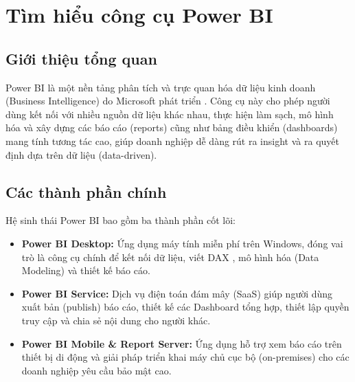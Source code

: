 \section{Tìm hiểu công cụ Power BI}

\subsection{Giới thiệu tổng quan}
Power BI là một nền tảng phân tích và trực quan hóa dữ liệu kinh doanh (Business Intelligence) do Microsoft phát triển \cite{powerbi_docs}. Công cụ này cho phép người dùng kết nối với nhiều nguồn dữ liệu khác nhau, thực hiện làm sạch, mô hình hóa và xây dựng các báo cáo (reports) cũng như bảng điều khiển (dashboards) mang tính tương tác cao, giúp doanh nghiệp dễ dàng rút ra insight và ra quyết định dựa trên dữ liệu (data-driven).

\subsection{Các thành phần chính}
Hệ sinh thái Power BI bao gồm ba thành phần cốt lõi:
\begin{itemize}
    \item \textbf{Power BI Desktop:} Ứng dụng máy tính miễn phí trên Windows, đóng vai trò là công cụ chính để kết nối dữ liệu, viết DAX \cite{dax_reference}, mô hình hóa (Data Modeling) và thiết kế báo cáo.
    \item \textbf{Power BI Service:} Dịch vụ điện toán đám mây (SaaS) giúp người dùng xuất bản (publish) báo cáo, thiết kế các Dashboard tổng hợp, thiết lập quyền truy cập và chia sẻ nội dung cho người khác.
    \item \textbf{Power BI Mobile \& Report Server:} Ứng dụng hỗ trợ xem báo cáo trên thiết bị di động và giải pháp triển khai máy chủ cục bộ (on-premises) cho các doanh nghiệp yêu cầu bảo mật cao.
\end{itemize}

